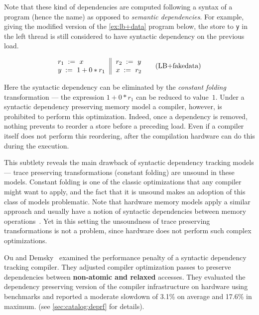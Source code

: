 Note that these kind of dependencies are computed following a 
syntax of a program (hence the name) as opposed 
to \emph{semantic dependencies}.
For example, giving the modified version of 
the \ref{ex:lb+data} program below, 
the store to \texttt{y} in the left thread
is still considered to have syntactic dependency 
on the previous load. 

\begin{equation*}
\inarrII{
  \readInst{}{r_1}{x}           \\
  \writeInst{}{y}{1 + 0 * r_1}  \\
}{
  \readInst{}{r_2}{y}      \\
  \writeInst{}{x}{r_2}     \\
}
\tag{LB+fakedata}\label{ex:lb+fakedata}
\end{equation*}

Here the syntactic dependency can be eliminated 
by the \emph{constant folding} transformation --- 
the expression $1 + 0 * r_1$ can be reduced to value~$1$.
Under a syntactic dependency preserving memory model 
a compiler, however, is prohibited to perform this optimization. 
Indeed, once a dependency is removed, nothing prevents 
to reorder a store before a preceding load. 
Even if a compiler itself does not perform this reordering,
after the compilation hardware can 
do this during the execution.   

This subtlety reveals the main drawback of 
syntactic dependency tracking models --- 
trace preserving transformations
(\eg constant folding) are unsound in these models. 
Constant folding is one of the classic optimizations 
that any compiler might want to apply, 
and the fact that it is unsound  
makes an adoption of this class of models problematic.
Note that hardware memory models apply a similar approach 
and usually have a notion of syntactic dependencies between 
memory operations~\cite{Sarkar-al:PLDI11, Alglave-al:TOPLAS14, Pulte-al:POPL18}.
Yet in this setting the unsoundness of 
trace preserving transformations is not a problem,
since hardware does not perform such complex optimizations.

Ou and Demsky~\cite{Ou-Demsky:OOPSLA18} examined
the performance penalty of a syntactic 
dependency tracking compiler.
They adjusted compiler optimization passes to preserve
dependencies between \textbf{non-atomic and relaxed} accesses.
They evaluated the dependency preserving 
version of the \LLVM compiler infrastructure 
on  hardware using \SPECCPU benchmarks
and reported a moderate slowdown of 
3.1\% on average and 17.6\% in maximum. 
(see \ref{sec:catalog:deprf} for details).

